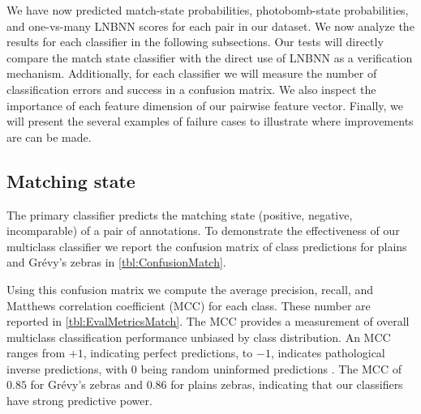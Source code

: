     We have now predicted match-state probabilities, photobomb-state probabilities, and one-vs-many LNBNN scores
      for each pair in our dataset.
    We now analyze the results for each classifier in the following subsections.
    Our tests will directly compare the match state classifier with the direct use of LNBNN as a verification
      mechanism.
    Additionally, for each classifier we will measure the number of classification errors and success in a
      confusion matrix.
    We also inspect the importance of each feature dimension of our pairwise feature vector.
    Finally, we will present the several examples of failure cases to illustrate where improvements are can be
      made.




    \subsection{Matching state}

        The primary classifier predicts the matching state (positive, negative, incomparable) of a pair of
          annotations.
        To demonstrate the effectiveness of our multiclass classifier we report the confusion matrix of class
          predictions for plains and Grévy's zebras in \cref{tbl:ConfusionMatch}.

        \ConfusionMatch{}

        \EvalMetricsMatch{}

        Using this confusion matrix we compute the average precision, recall, and Matthews correlation
          coefficient (MCC) for each class.
        These number are reported in \cref{tbl:EvalMetricsMatch}.
        The MCC provides a measurement of overall multiclass classification performance unbiased by class
          distribution.
        An MCC ranges from $+1$, indicating perfect predictions, to $-1$, indicates pathological inverse
          predictions, with $0$ being random uninformed predictions \cite{powers_evaluation_2011}.
        The MCC of $0.85$ for Grévy's zebras and $0.86$ for plains zebras, indicating that our classifiers have
          strong predictive power.
        

